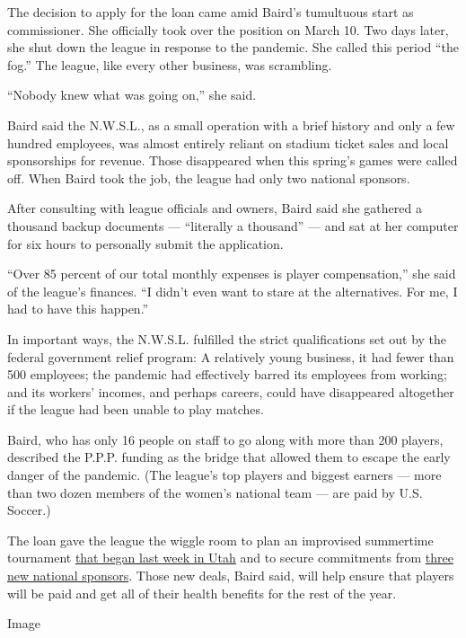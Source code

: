 The decision to apply for the loan came amid Baird's tumultuous start as
commissioner. She officially took over the position on March 10. Two
days later, she shut down the league in response to the pandemic. She
called this period ``the fog.'' The league, like every other business,
was scrambling.

``Nobody knew what was going on,'' she said.

Baird said the N.W.S.L., as a small operation with a brief history and
only a few hundred employees, was almost entirely reliant on stadium
ticket sales and local sponsorships for revenue. Those disappeared when
this spring's games were called off. When Baird took the job, the league
had only two national sponsors.

After consulting with league officials and owners, Baird said she
gathered a thousand backup documents --- ``literally a thousand'' ---
and sat at her computer for six hours to personally submit the
application.

``Over 85 percent of our total monthly expenses is player
compensation,'' she said of the league's finances. ``I didn't even want
to stare at the alternatives. For me, I had to have this happen.''

In important ways, the N.W.S.L. fulfilled the strict qualifications set
out by the federal government relief program: A relatively young
business, it had fewer than 500 employees; the pandemic had effectively
barred its employees from working; and its workers' incomes, and perhaps
careers, could have disappeared altogether if the league had been unable
to play matches.

Baird, who has only 16 people on staff to go along with more than 200
players, described the P.P.P. funding as the bridge that allowed them to
escape the early danger of the pandemic. (The league's top players and
biggest earners --- more than two dozen members of the women's national
team --- are paid by U.S. Soccer.)

The loan gave the league the wiggle room to plan an improvised
summertime tournament
\href{https://www.nytimes3xbfgragh.onion/2020/06/26/sports/soccer/nwsl-anthem-protest-kaiya-mccullough.html}{that
began last week in Utah} and to secure commitments from
\href{https://twitter.com/NWSL/status/1265612731186634755}{three new
national sponsors}. Those new deals, Baird said, will help ensure that
players will be paid and get all of their health benefits for the rest
of the year.

Image


